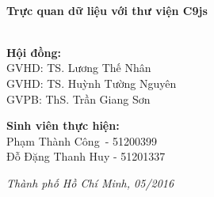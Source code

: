 \begin{titlepage}
\HRule \\[0.4cm]
{ \huge \bfseries Trực quan dữ liệu với thư viện C9js}\\[0.4cm] %
\HRule \\[0.8cm]

\begin{flushright}
\begin{minipage}{0.7\textwidth}

\end{minipage}
\end{flushright}

\begin{flushleft} \large
\textbf{Hội đồng:}\\
\tab[2cm] GVHD: TS. Lương Thế Nhân\\
\tab[2cm] GVHD: TS. Huỳnh Tường Nguyên\\
\tab[2cm] GVPB: ThS. Trần Giang Sơn\\
\end{flushleft}

\begin{flushleft} \large
\textbf{Sinh viên thực hiện:}\\
\tab[2cm] Phạm Thành Công\quad \ - 51200399\\
\tab[2cm] Đỗ Đặng Thanh Huy - 51201337\\[1.5cm]
\end{flushleft}


\large \emph{Thành phố Hồ Chí Minh, 05/2016}

\vfill %

\end{titlepage}